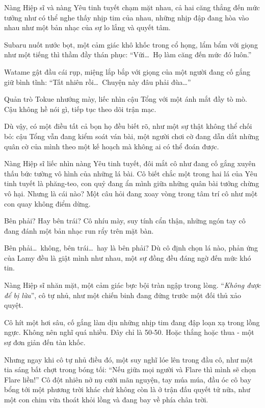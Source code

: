 \documentclass[../main.tex]{subfiles}
\begin{document}
Nàng Hiệp sĩ và nàng Yêu tinh tuyết chạm mặt nhau, cả hai căng thẳng đến mức tưởng như có thể nghe thấy nhịp tim của nhau, những nhịp đập đang hòa vào nhau như một bản nhạc của sự lo lắng và quyết tâm.


Subaru nuốt nước bọt, một cảm giác khô khốc trong cổ họng, lẩm bẩm với giọng như một tiếng thì thầm đầy thán phục: ``Vữi\dots\ Họ làm căng đến mức đó luôn.''

Watame gật đầu cái rụp, miệng lắp bắp với giọng của một người đang cố gắng giữ bình tĩnh: ``Tất nhiên rồi\dots\ Chuyện này đâu phải đùa\dots''

Quản trò Tokue nhướng mày, liếc nhìn cậu Tổng với một ánh mắt đầy tò mò. Cậu không hề nói gì, tiếp tục theo dõi trận mạc.

Dù vậy, có một điều tất cả bọn họ đều biết rõ, như một sự thật không thể chối bỏ: cậu Tổng vẫn đang kiểm soát ván bài, một người chơi cờ đang dẫn dắt những quân cờ của mình theo một kế hoạch mà không ai có thể đoán được.

Nàng Hiệp sĩ liếc nhìn nàng Yêu tinh tuyết, đôi mắt cô như đang cố gắng xuyên thấu bức tường vô hình của những lá bài. Cô biết chắc một trong hai lá của Yêu tinh tuyết là phăng-teo, con quỷ đang ẩn mình giữa những quân bài tưởng chừng vô hại. Nhưng là cái nào? Một câu hỏi đang xoay vòng trong tâm trí cô như một con quay không điểm dừng.

Bên phải? Hay bên trái? Cô nhíu mày, suy tính cẩn thận, những ngón tay cô đang đánh một bản nhạc run rẩy trên mặt bàn.

Bên phải\dots\ không, bên trái\dots\ hay là bên phải? Dù cô định chọn lá nào, phản ứng của Lamy đều là giật mình như nhau, một sự đồng đều đáng ngờ đến mức khó tin.


Nàng Hiệp sĩ nhăn mặt, một cảm giác bực bội tràn ngập trong lòng. ``\textit{Không được để bị lừa}'', cô tự nhủ, như một chiến binh đang đứng trước một đối thủ xảo quyệt.

Cô hít một hơi sâu, cố gắng làm dịu những nhịp tim đang đập loạn xạ trong lồng ngực. Không nên nghĩ quá nhiều. Đây chỉ là 50-50. Hoặc thắng hoặc thua - một sự đơn giản đến tàn khốc.

Nhưng ngay khi cô tự nhủ điều đó, một suy nghĩ lóe lên trong đầu cô, như một tia sáng bất chợt trong bóng tối: ``Nếu giữa mọi người và Flare thì mình sẽ chọn Flare liền!'' Cô đột nhiên nở nụ cười mãn nguyện, tay múa múa, đầu óc cô bay bổng tới một phương trời khác chứ không còn là ở trận đấu quyết tử nữa, như một con chim vừa thoát khỏi lồng và đang bay về phía chân trời.
\end{document}
